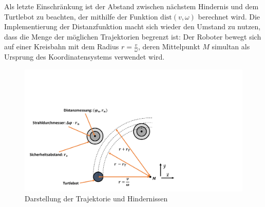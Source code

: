Als letzte Einschränkung ist der Abstand zwischen nächstem Hindernis und dem Turtlebot zu beachten, der mithilfe der Funktion $\text{dist}(v,\omega)$ berechnet wird. Die Implementierung der Distanzfunktion macht sich wieder den Umstand zu nutzen, dass die Menge der möglichen Trajektorien begrenzt ist: Der Roboter bewegt sich auf einer Kreisbahn mit dem Radius $r=\frac{v}{\omega}$, deren Mittelpunkt $M$ simultan als Ursprung des Koordinatensystems verwendet wird. 
\begin{figure}[!ht]
\centering
\includegraphics[width=0.7\linewidth, trim={0cm 0cm 10cm 6cm}, clip]{img/Distanz_img1}
\caption{Darstellung der Trajektorie und Hindernissen}
\end{figure}

